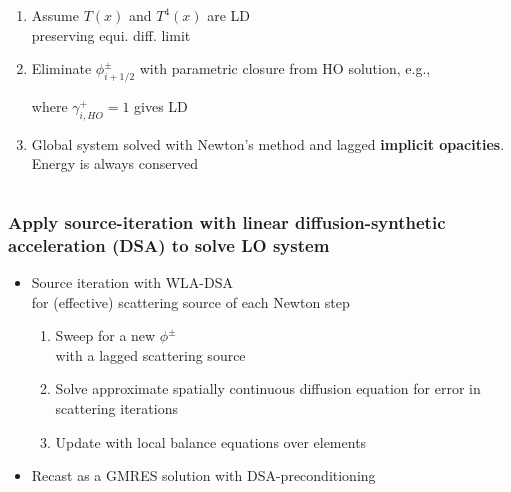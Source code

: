 \documentclass[xcolor=dvipsnames,hyperref={pdfpagelabels=false},unknownkeysallowed]{beamer}
\newcommand{\colb}[1]{{\color{blue} #1}}
\newcommand{\colG}[1]{{\color{Gray!110} #1}}
\newlength{\wideitemsep}
\let\olditem\item
\renewcommand{\item}{\setlength{\itemsep}{\wideitemsep}\olditem}
\newcommand{\mom}[1]{\langle #1 \rangle}
\begin{document}
\begin{frame}
\begin{columns}
\begin{column}{0.75\linewidth}
    \addtolength{\wideitemsep}{0.11in}
    \begin{enumerate}
        \item Assume $T(x)$ and $T^4(x)$ are LD \\
            \colG{preserving equi. diff. limit}
        \item Eliminate $\phi_{i+1/2}^\pm$ with parametric closure from HO solution, e.g., \vspace{0.1in}
            \begin{center}{\textcolor{Gray}{%
                    \fbox{ {\color{black} $\displaystyle  
            \phi_{i+1/2}^+ = \colb{\gamma_{i,HO}^+}\mom{\phi}_{a,i}^+ + \mom{\phi}_{x,i}^+$}}}}
            \end{center}
            \colG{where  {$\gamma_{i,HO}^+ = 1$ gives LD}}
            \vspace{0.1in}
       \item Global system solved with Newton's method and lagged \textbf{implicit
           opacities}.\\ \colG{Energy is always conserved}
       \end{enumerate}
    \end{column}
\end{columns}
\end{frame}

\begin{frame}
    \frametitle{Apply source-iteration with linear diffusion-synthetic acceleration (DSA) to solve LO system}
    \begin{itemize}
        \item[] Source iteration with WLA-DSA \\ \colG{for (effective) scattering source
            of each Newton step}
            \vspace{0.1in}
            \begin{enumerate}
                \item Sweep for a new $\phi^{\pm}$ \\ \colG{with a lagged scattering
                    source}
                \item Solve approximate \colb{spatially continuous} diffusion equation for error in
                    scattering iterations
                \item Update with local balance equations over elements
            \end{enumerate}
         \item[] Recast as a GMRES solution with DSA-preconditioning
     \end{itemize}
\end{frame}
\end{document}
